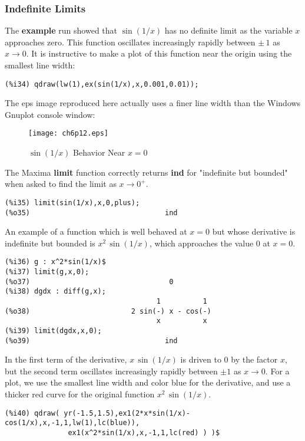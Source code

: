 \documentclass[12pt]{article}
\begin{document}
\subsubsection{Indefinite Limits}
The \textbf{example} run showed that $\sin(1/x)$ has no definite limit as
  the variable $x$ approaches zero.
This function oscillates increasingly rapidly between $\pm \,1$ as $x \rightarrow 0$.
It is instructive to make a plot of this function near the origin 
  using the smallest line width:
\small
\begin{verbatim}
(%i34) qdraw(lw(1),ex(sin(1/x),x,0.001,0.01));
\end{verbatim}
\normalsize
%

The eps image reproduced here actually uses a finer line width than
  the Windows Gnuplot console window:
\begin{figure} [h]
   \centerline{\texttt{[image: ch6p12.eps]} }
	\caption{ $\sin(1/x)$ Behavior Near $x = 0$  }
\end{figure} 

\newpage

The Maxima \textbf{limit} function correctly returns \textbf{ind} for "indefinite 
  but bounded" when asked to find the limit as $x \rightarrow 0^{+}$.
\small
\begin{verbatim}
(%i35) limit(sin(1/x),x,0,plus);
(%o35)                                ind
\end{verbatim}
\normalsize

\smallskip
An example of a function which is well behaved at $x=0$ but whose derivative is
  indefinite but bounded is $x^2\,\sin(1/x)$, which approaches the value $0$ at
  $x = 0$.
\small
\begin{verbatim}
(%i36) g : x^2*sin(1/x)$
(%i37) limit(g,x,0);
(%o37)                                 0
(%i38) dgdx : diff(g,x);
                                    1          1
(%o38)                        2 sin(-) x - cos(-)
                                    x          x
(%i39) limit(dgdx,x,0);
(%o39)                                ind
\end{verbatim}
\normalsize
In the first term of the derivative, $x\,\sin(1/x)$ is driven to $0$ by the factor $x$,
  but the second term oscillates increasingly rapidly between $\pm 1$ as $x \rightarrow 0$.
For a plot, we use the smallest line width and color blue for the derivative, and
  use a thicker red curve for the original function $x^2\,\sin(1/x)$.
\small
\begin{verbatim}
(%i40) qdraw( yr(-1.5,1.5),ex1(2*x*sin(1/x)-cos(1/x),x,-1,1,lw(1),lc(blue)),
               ex1(x^2*sin(1/x),x,-1,1,lc(red) ) )$
\end{verbatim}
\normalsize
\end{document}

